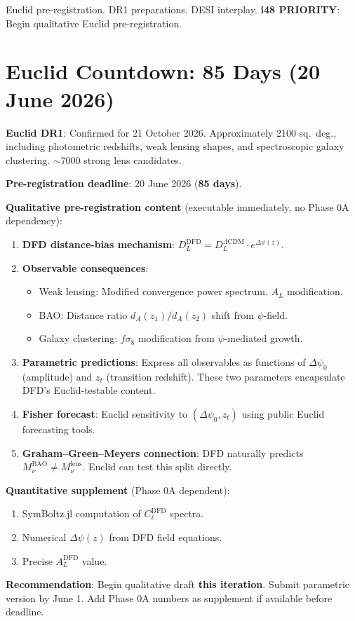\documentclass[11pt,a4paper]{article}
\begin{document}
Euclid pre-registration. DR1 preparations. DESI interplay. \textbf{i48 PRIORITY}: Begin qualitative Euclid pre-registration.

\section{Euclid Countdown: 85 Days (20 June 2026)}

\begin{tcolorbox}[colback=red!5!white, colframe=red!60!black,
  title={Euclid Pre-Registration: 85 Days --- QUALITATIVE DRAFT SPECIFICATION}]

\textbf{Euclid DR1}: Confirmed for 21 October 2026. Approximately 2100 sq.\ deg., including photometric redshifts, weak lensing shapes, and spectroscopic galaxy clustering. $\sim$7000 strong lens candidates.

\textbf{Pre-registration deadline}: 20 June 2026 (\textbf{85 days}).

\textbf{Qualitative pre-registration content} (executable immediately, no Phase 0A dependency):
\begin{enumerate}
\item \textbf{DFD distance-bias mechanism}: $D_L^{\text{DFD}} = D_L^{\Lambda\text{CDM}} \cdot e^{\Delta\psi(z)}$.
\item \textbf{Observable consequences}:
  \begin{itemize}
  \item Weak lensing: Modified convergence power spectrum. $A_L$ modification.
  \item BAO: Distance ratio $d_A(z_1)/d_A(z_2)$ shift from $\psi$-field.
  \item Galaxy clustering: $f\sigma_8$ modification from $\psi$-mediated growth.
  \end{itemize}
\item \textbf{Parametric predictions}: Express all observables as functions of $\Delta\psi_0$ (amplitude) and $z_t$ (transition redshift). These two parameters encapsulate DFD's Euclid-testable content.
\item \textbf{Fisher forecast}: Euclid sensitivity to $(\Delta\psi_0, z_t)$ using public Euclid forecasting tools.
\item \textbf{Graham--Green--Meyers connection}: DFD naturally predicts $M_\nu^{\text{BAO}} \neq M_\nu^{\text{lens}}$. Euclid can test this split directly.
\end{enumerate}

\textbf{Quantitative supplement} (Phase 0A dependent):
\begin{enumerate}
\item SymBoltz.jl computation of $C_\ell^{\text{DFD}}$ spectra.
\item Numerical $\Delta\psi(z)$ from DFD field equations.
\item Precise $A_L^{\text{DFD}}$ value.
\end{enumerate}

\textbf{Recommendation}: Begin qualitative draft \textbf{this iteration}. Submit parametric version by June 1. Add Phase 0A numbers as supplement if available before deadline.
\end{tcolorbox}
\end{document}
